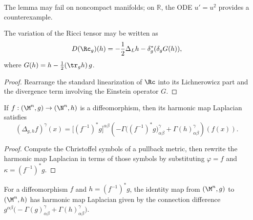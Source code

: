 \begin{remark}
\label{ch03-rem-noncompact-flow-failure}
The lemma may fail on noncompact manifolds; on \(\mathbb R\), the ODE \(u'=u^2\) provides a counterexample.
\end{remark}

\begin{lemma}
\label{ch03-lem-riemann-tensor-decomposition}
The variation of the Ricci tensor may be written as
\[
D(\Rc_g)(h)=-\frac12\Delta_L h-\delta_g^*(\delta_g G(h)),
\]
where \(G(h)=h-\frac12(\tr_g h)\,g\).
\end{lemma}

\begin{proof}
\sketch Rearrange the standard linearization of \(\Rc\) into its Lichnerowicz part and the divergence term involving the Einstein operator \(G\).
\end{proof}

\begin{lemma}
\label{ch03-lem-harmonic-map-laplacian}
If \(f:(\M^n,g)\to(\N^n,h)\) is a diffeomorphism, then its harmonic map Laplacian satisfies
\[
(\Delta_{g,h}f)^\gamma(x)
=\bigl[(f^{-1})^*g\bigr]^{\alpha\beta}
\left(-\Gamma\bigl((f^{-1})^*g\bigr)^\gamma_{\alpha\beta}+\Gamma(h)^\gamma_{\alpha\beta}\right)\!(f(x)).
\]
\end{lemma}

\begin{proof}
\sketch Compute the Christoffel symbols of a pullback metric, then rewrite the harmonic map Laplacian in terms of those symbols by substituting \(\varphi=f\) and \(\kappa=(f^{-1})^*g\).
\end{proof}

\begin{corollary}
\label{ch03-cor-identity-harmonic-map}
For a diffeomorphism \(f\) and \(h=(f^{-1})^*g\), the identity map from \((\M^n,g)\) to \((\M^n,h)\) has harmonic map Laplacian given by the connection difference \(g^{\alpha\beta}\bigl(-\Gamma(g)^\gamma_{\alpha\beta}+\Gamma(h)^\gamma_{\alpha\beta}\bigr)\).
\end{corollary}

